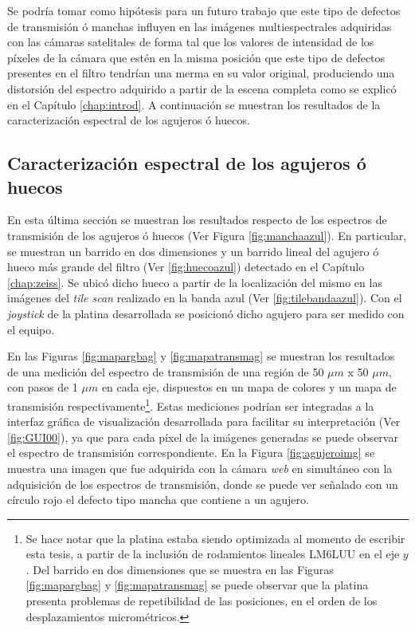 Se podría tomar como hipótesis para un futuro trabajo que este tipo de defectos de transmisión ó manchas influyen en las imágenes multiespectrales adquiridas con las cámaras satelitales de forma tal que los valores de intensidad de los píxeles de la cámara que estén en la misma posición que este tipo de defectos presentes en el filtro tendrían una merma en su valor original, produciendo una distorsión del espectro adquirido a partir de la escena completa como se explicó en el Capítulo \ref{chap:introd}. A continuación se muestran los resultados de la caracterización espectral de los agujeros ó huecos.



\singlespacing
\subsection{Caracterización espectral de los agujeros ó huecos}
\label{sec:defctag}

\hspace{0.5cm}En esta última sección se muestran los resultados respecto de los espectros de transmisión de los agujeros ó huecos (Ver Figura \ref{fig:manchaazul}). En particular, se muestran un barrido en dos dimensiones y un barrido lineal del agujero ó hueco más grande del filtro (Ver \ref{fig:huecoazul}) detectado en el Capítulo \ref{chap:zeiss}. Se ubicó dicho hueco a partir de la localización del mismo en las imágenes del \textit{tile scan} realizado en la banda azul (Ver \ref{fig:tilebandaazul}). Con el \textit{joystick} de la platina desarrollada se posicionó dicho agujero para ser medido con el equipo.

En las Figuras \ref{fig:mapargbag} y \ref{fig:mapatransmag} se muestran los resultados de una medición del espectro de transmisión de una región de 50 $\mu m$ x 50 $\mu m$, con pasos de 1 $\mu m$ en cada eje, dispuestos en un mapa de colores y un mapa de transmisión respectivamente\footnote{Se hace notar que la platina estaba siendo optimizada al momento de escribir esta tesis, a partir de la inclusión de rodamientos lineales LM6LUU en el eje \textit{$y$}. Del barrido en dos dimensiones que se muestra en las Figuras \ref{fig:mapargbag} y \ref{fig:mapatransmag} se puede observar que la platina presenta problemas de repetibilidad de las posiciones, en el orden de los desplazamientos micrométricos.}. Estas mediciones podrían ser integradas a la interfaz gráfica de visualización desarrollada para facilitar su interpretación (Ver \ref{fig:GUI00}), ya que para cada píxel de la imágenes generadas se puede observar el espectro de transmisión correspondiente. En la Figura \ref{fig:agujeroimg} se muestra una imagen que fue adquirida con la cámara \textit{web} en simultáneo con la adquisición de los espectros de transmisión, donde se puede ver señalado con un círculo rojo el defecto tipo mancha que contiene a un agujero.

